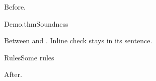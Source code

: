 Before.
\begin{leantheorem}[label=thm:sound]{Demo.thm}{Soundness}
\end{leantheorem}
Between  and .
Inline check  stays in its sentence.
\begin{leanrules}{Rules}{Some rules}%
\end{leanrules}
\leanindex
After.
